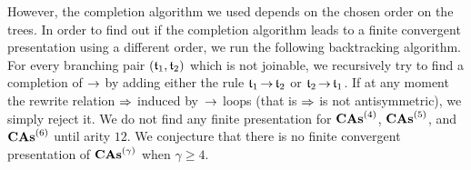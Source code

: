 However, the completion algorithm we used depends on the chosen order on
the trees. In order to find out if the completion algorithm leads to a
finite convergent presentation using a different order, we run the
following backtracking algorithm. For every branching pair
$(\mathfrak{t}_1, \mathfrak{t}_2)$ which is not joinable, we recursively try to find a
completion of $\operatorname{\to}$ by adding either the rule
$\mathfrak{t}_1 \operatorname{\to}  \mathfrak{t}_2$ or $\mathfrak{t}_2 \operatorname{\to}  \mathfrak{t}_1$.
If at any moment the rewrite relation $\operatorname{\Rightarrow}$ induced by~$\operatorname{\to}$
loops (that is $\operatorname{\Rightarrow}$ is not antisymmetric), we simply reject it.
We do not find any finite presentation for $\mathbf{CAs}^{\left(4\right)}$, $\mathbf{CAs}^{\left(5\right)}$, and
$\mathbf{CAs}^{\left(6\right)}$ until arity $12$. We conjecture that there is no finite
convergent presentation of $\mathbf{CAs}^{\left(\gamma\right)}$ when
$\gamma \geq 4$.
\medbreak

